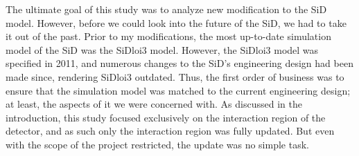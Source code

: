 \documentclass{report}
\begin{document}
            The ultimate goal of this study was to analyze new modification to the SiD model. However, before we could look into the future of the SiD, we had to take it out of the past. Prior to my modifications, the most up-to-date simulation model of the SiD was the SiDloi3 model. However, the SiDloi3 model was specified in 2011, and numerous changes to the SiD's engineering design had been made since, rendering SiDloi3 outdated. Thus, the first order of business was to ensure that the simulation model was matched to the current engineering design; at least, the aspects of it we were concerned with. As discussed in the introduction, this study focused exclusively on the interaction region of the detector, and as such only the interaction region was fully updated. But even with the scope of the project restricted, the update was no simple task.
\end{document}
